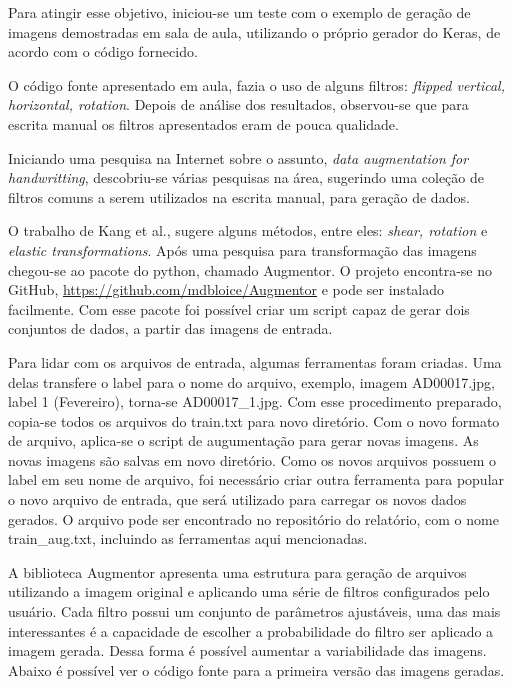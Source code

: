 \documentclass[12pt,
	english,			%
	french,				%
	spanish,			%
	brazil,				%
	]{article}
\begin{document}
Para atingir esse objetivo, iniciou-se um teste com o exemplo de geração de imagens demostradas em sala de aula, utilizando o próprio gerador do Keras, de acordo com o código fornecido.

O código fonte apresentado em aula, fazia o uso de alguns filtros: \textit{flipped vertical, horizontal, rotation}. Depois de análise dos resultados, observou-se que para escrita manual os filtros apresentados eram de pouca qualidade. 

Iniciando uma pesquisa na Internet sobre o assunto, \textit{data augmentation for handwritting}, descobriu-se várias pesquisas na área, sugerindo uma coleção de filtros comuns a serem utilizados na escrita manual, para geração de dados.

O trabalho de Kang et al.\cite{kang2019candidate}, sugere alguns métodos, entre eles: \textit{shear, rotation} e \textit{elastic transformations}. Após uma pesquisa para transformação das imagens chegou-se ao pacote do python, chamado Augmentor. O projeto encontra-se no GitHub, \url{https://github.com/mdbloice/Augmentor} e pode ser instalado facilmente. Com esse pacote foi possível criar um script capaz de gerar dois conjuntos de dados, a partir das imagens de entrada.

Para lidar com os arquivos de entrada, algumas ferramentas foram criadas. Uma delas transfere o label para o nome do arquivo, exemplo, imagem AD00017.jpg, label 1 (Fevereiro), torna-se AD00017\_1.jpg. Com esse procedimento preparado, copia-se todos os arquivos do train.txt para novo diretório. Com o novo formato de arquivo, aplica-se o script de augumentação para gerar novas imagens. As novas imagens são salvas em novo diretório. Como os novos arquivos possuem o label em seu nome de arquivo, foi necessário criar outra ferramenta para popular o novo arquivo de entrada, que será utilizado para carregar os novos dados gerados. O arquivo pode ser encontrado no repositório do relatório, com o nome train\_aug.txt, incluindo as ferramentas aqui mencionadas.


A biblioteca Augmentor apresenta uma estrutura para geração de arquivos utilizando a imagem original e aplicando uma série de filtros configurados pelo usuário. Cada filtro possui um conjunto de parâmetros ajustáveis, uma das mais interessantes é a capacidade de escolher a probabilidade do filtro ser aplicado a imagem gerada. Dessa forma é possível aumentar a variabilidade das imagens. Abaixo é possível ver o código fonte para a primeira versão das imagens geradas.
\end{document}
